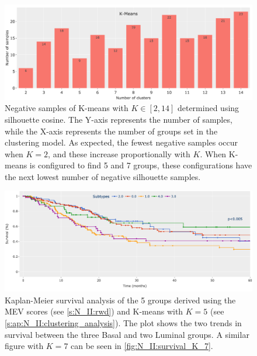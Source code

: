 \begin{figure}[H]    
    \centering
    \includegraphics[width=1.0\textwidth,height=1.0\textheight,keepaspectratio]{Sections/Network_II/resources/reward/cluster_analysis/neg_samples.png}
    \caption{Negative samples of K-means with $K \in [2,14]$ determined using silhouette cosine. The Y-axis represents the number of samples, while the X-axis represents the number of groups set in the clustering model. As expected, the fewest negative samples occur when $K=2$, and these increase proportionally with $K$. When K-means is configured to find 5 and 7 groups, these configurations have the next lowest number of negative silhouette samples.}
    \label{fig:ap:neg_samples}
\end{figure}

\begin{figure}[H]    
    \centering
    \includegraphics[width=1.0\textwidth,height=1.0\textheight,keepaspectratio]{Sections/Network_II/resources/reward/cluster_analysis/survival_K_5.png}
    \caption{Kaplan-Meier survival analysis of the 5 groups derived using the MEV scores (see \cref{s:N_II:rwd}) and K-means with $K=5$ (see \cref{s:ap:N_II:clustering_analysis}). The plot shows the two trends in survival between the three Basal and two Luminal groups. A similar figure with $K=7$ can be seen in \cref{fig:N_II:survival_K_7}.}
    \label{fig:ap:survival_K_5}
\end{figure}


